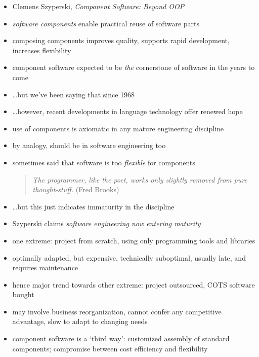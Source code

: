 \documentclass{sepslide-soa-faked} %
\begin{document}
\begin{slide}
\begin{itemize}
\item Clemens Szyperski, \textit{Component Software: Beyond OOP}
\item \emph{software components} enable practical reuse of software parts
\item composing components improves quality, supports rapid development,
increases flexibility
\item component software expected to be \emph{the} cornerstone of software
in the years to come
\item \ldots but we've been saying that since 1968
\item \ldots however, recent developments in language technology offer
renewed hope
\end{itemize}
\end{slide}

\begin{slide}
\begin{itemize}
\item use of components is axiomatic in any mature engineering discipline
\item by analogy, should be in software engineering too
\item sometimes said that software is too \emph{flexible} for components
\begin{quote}
\emph{The programmer, like the poet, works only slightly removed from pure thought-stuff.} (Fred Brooks)
\end{quote}
\item \ldots but this just indicates immaturity in the discipline
\item Szyperski claims \emph{software engineering now entering maturity}
\end{itemize}
\end{slide}

\begin{slide}
\begin{itemize}
\item one extreme: project from scratch, using only programming tools and
libraries 
\item optimally adapted, but expensive, technically
suboptimal, usually late, and requires maintenance
\item hence major trend towards other extreme: project outsourced, COTS software bought
\item 
  may involve business reorganization,
  cannot confer any competitive advantage,
  slow to adapt to changing needs
\item component software is a `third way': customized assembly of standard
components; compromise between cost efficiency and flexibility
\end{itemize}
\end{slide}
\end{document}
